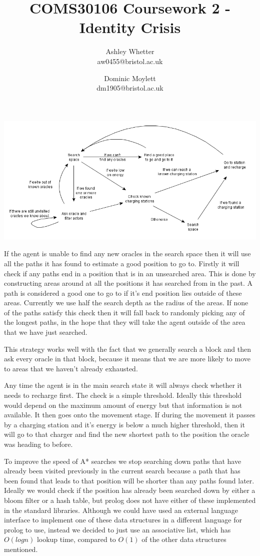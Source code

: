 \documentclass[12pt,a4paper]{article}
\title{\vspace{-1.5cm}COMS30106 Coursework 2 - Identity Crisis}
\author{Ashley Whetter \\ aw0455@bristol.ac.uk
\and
Dominic Moylett \\
dm1905@bristol.ac.uk}
\date{}
\begin{document}
\maketitle
\vspace{-0.5cm}
\includegraphics[width=\textwidth]{state_diagram.png}

If the agent is unable to find any new oracles in the search space then it will use all the paths it has found to estimate a good position to go to.
Firstly it will check if any paths end in a position that is in an unsearched area.
This is done by constructing areas around at all the positions it has searched from in the past.
A path is considered a good one to go to if it's end position lies outside of these areas.
Currently we use half the search depth as the radius of the areas.
If none of the paths satisfy this check then it will fall back to randomly picking any of the longest paths,
in the hope that they will take the agent outside of the area that we have just searched.

This strategy works well with the fact that we generally search a block and then
ask every oracle in that block,
because it means that we are more likely to move to areas that we haven't already exhausted.

Any time the agent is in the main search state it will always check whether it needs to recharge first.
The check is a simple threshold.
Ideally this threshold would depend on the maximum amount of energy but that information is not available.
It then goes onto the movement stage.
If during the movement it passes by a charging station and it's energy is below a much higher threshold,
then it will go to that charger and find the new shortest path to the position the oracle was heading to before.

To improve the speed of A* searches we stop searching down paths that have already been visited previously in the current search
because a path that has been found that leads to that position will be shorter than any paths found later.
Ideally we would check if the position has already been searched down by either a bloom filter or a hash table,
but prolog does not have either of these implemented in the standard libraries.
Although we could have used an external language interface to implement one of these data structures in a different language for prolog to use,
instead we decided to just use an associative list,
which has $O(logn)$ lookup time, compared to $O(1)$ of the other data structures mentioned.
\end{document}
